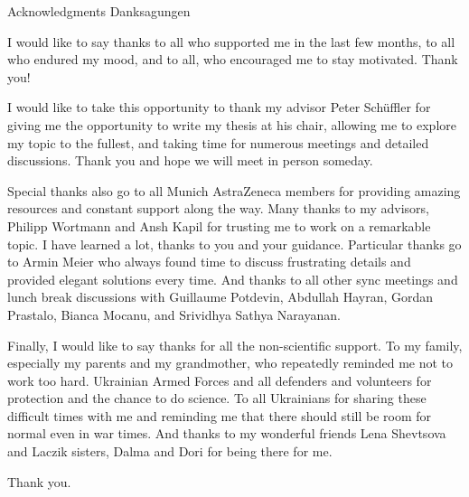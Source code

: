\makeatletter
{}
{}
{}
\makeatother
\thispagestyle{empty}

\vspace*{20mm}

\begin{center}
\makeatletter
{}
{ Acknowledgments}
{ Danksagungen}
\makeatother
\end{center}

\vspace{10mm}

I would like to say thanks to all who supported me in the last few months, to all who endured my mood, and to all, who encouraged me to stay motivated. Thank you!

I would like to take this opportunity to thank my advisor Peter Schüffler for giving me the opportunity to write my thesis at his chair, allowing me to explore my topic to the fullest, and taking time for numerous meetings and detailed discussions. Thank you and hope we will meet in person someday.

Special thanks also go to all Munich AstraZeneca members for providing amazing resources and constant support along the way. Many thanks to my advisors, Philipp Wortmann and Ansh Kapil for trusting me to work on a remarkable topic. I have learned a lot, thanks to you and your guidance. Particular thanks go to Armin Meier who always found time to discuss frustrating details and provided elegant solutions every time. And thanks to all other sync meetings and lunch break discussions with Guillaume Potdevin, Abdullah Hayran, Gordan Prastalo, Bianca Mocanu, and Srividhya Sathya Narayanan. 

Finally, I would like to say thanks for all the non-scientific support. To my family, especially my parents and my grandmother, who repeatedly reminded me not to work too hard.
Ukrainian Armed Forces and all defenders and volunteers for protection and the chance to do science. To all Ukrainians for sharing these difficult times with me and reminding me that there should still be room for normal even in war times.  And thanks to my wonderful friends Lena Shevtsova and Laczik sisters, Dalma and Dori for being there for me.

Thank you.

\cleardoublepage{}
